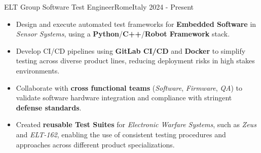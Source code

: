 
\begin{experiences}
  \experience
    {ELT Group}   {Software Test Engineer}{Rome}{Italy}
    {2024 - Present} {
                      \begin{itemize}
                        \item Design and execute automated test frameworks for \textbf{Embedded Software} in \textit{Sensor Systems}, using a \textbf{Python}/\textbf{C++}/\textbf{Robot Framework} stack.
                        \item Develop CI/CD pipelines using \textbf{GitLab CI/CD} and \textbf{Docker} to simplify testing across diverse product lines, reducing deployment risks in high stakes environments.
                        \item Collaborate with \textbf{cross functional teams} (\textit{Software}, \textit{Firmware}, \textit{QA}) to validate software hardware integration and compliance with stringent \textbf{defense standards}.
                        \item Created \textbf{reusable Test Suites} for \textit{Electronic Warfare Systems}, such as \textit{Zeus} and \textit{ELT-162}, enabling the use of consistent testing procedures and approaches across different product specializations.
                      \end{itemize}
                    }
                    {}
\end{experiences}
